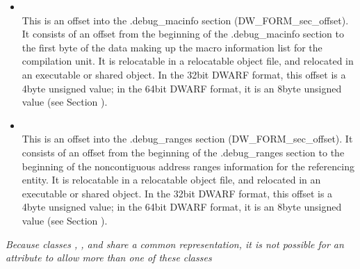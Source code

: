 \begin{itemize}
\item {} \\
This is an offset into the .debug\_macinfo section
(DW\_FORM\_sec\_offset). It consists of an offset from the
beginning of the .debug\_macinfo section to the first byte of
the data making up the macro information list for the compilation
unit. 
It is relocatable in a relocatable object file, and
relocated in an executable or shared object. In the 32\dash bit
DWARF format, this offset is a 4\dash byte unsigned value;
in the 64\dash bit DWARF format, it is an 8\dash byte unsigned value
(see Section ).

\item {} \\
This is an offset into the .debug\_ranges section
(DW\_FORM\_sec\_offset). 
It consists of an
offset from the beginning of the .debug\_ranges section
to the beginning of the non\dash contiguous address ranges
information for the referencing entity.  
It is relocatable in
a relocatable object file, and relocated in an executable or
shared object. In the 32\dash bit DWARF format, this offset
is a 4\dash byte unsigned value; in the 64\dash bit DWARF
format, it is an 8\dash byte unsigned value (see Section
).
\end{itemize}

\textit{Because classes , ,  and 
share a common representation, it is not possible for an
attribute to allow more than one of these classes}


